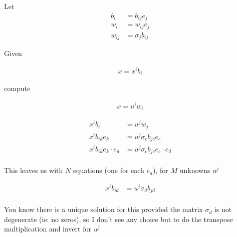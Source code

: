 \documentclass{article}      %
\begin{document}


Let
\begin{align*}
b_i &= b_{ij} e_j \\
w_i &= w_{ij} e_j \\
w_{ij} &= \sigma_j b_{ij}
\end{align*}

Given

\begin{align*}
x = x^i b_i
\end{align*}

compute

\begin{align*}
x = u^i w_i
\end{align*}

\begin{align*}
x^i b_i &= u^j w_j \\
x^i b_{ik} e_k &= u^j \sigma_c b_{jc} e_c \\
x^i b_{ik} e_k \cdot e_d &= u^j \sigma_c b_{jc} e_c \cdot e_d \\
\end{align*}

This leaves us with $N$ equations (one for each $e_d$), for $M$ unknowns $u^j$

\begin{align*}
x^i b_{id} &= u^j \sigma_d b_{jd} \\
\end{align*}

You know there is a unique solution for this provided the matrix $\sigma_d$ is not degenerate (ie: no zeros), so I don't see any choice but to do the transpose multiplication and invert for $u^j$

\end{document}
